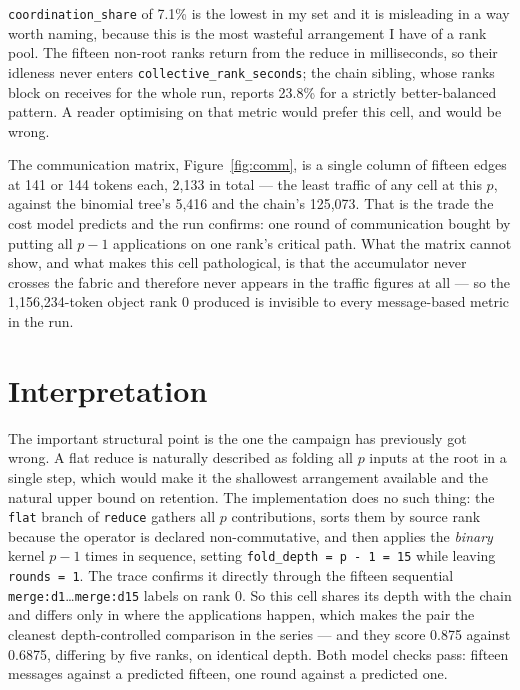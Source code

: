 \documentclass[11pt]{article}
\begin{document}
\texttt{coordination\_share} of 7.1\% is the lowest in my set and it is misleading in a way
worth naming, because this is the most wasteful arrangement I have of a rank pool. The
fifteen non-root ranks return from the reduce in milliseconds, so their idleness never
enters \texttt{collective\_rank\_seconds}; the chain sibling, whose ranks block on receives
for the whole run, reports 23.8\% for a strictly better-balanced pattern. A reader
optimising on that metric would prefer this cell, and would be wrong.

The communication matrix, Figure~\ref{fig:comm}, is a single column of fifteen edges at 141
or 144 tokens each, 2{,}133 in total --- the least traffic of any cell at this $p$, against
the binomial tree's 5{,}416 and the chain's 125{,}073. That is the trade the cost model
predicts and the run confirms: one round of communication bought by putting all $p-1$
applications on one rank's critical path. What the matrix cannot show, and what makes this
cell pathological, is that the accumulator never crosses the fabric and therefore never
appears in the traffic figures at all --- so the 1{,}156{,}234-token object rank 0 produced
is invisible to every message-based metric in the run.

\section{Interpretation}

The important structural point is the one the campaign has previously got wrong. A flat
reduce is naturally described as folding all $p$ inputs at the root in a single step, which
would make it the shallowest arrangement available and the natural upper bound on retention.
The implementation does no such thing: the \texttt{flat} branch of \texttt{reduce} gathers
all $p$ contributions, sorts them by source rank because the operator is declared
non-commutative, and then applies the \emph{binary} kernel $p-1$ times in sequence, setting
\texttt{fold\_depth = p - 1 = 15} while leaving \texttt{rounds = 1}. The trace confirms it
directly through the fifteen sequential \texttt{merge:d1}\dots\texttt{merge:d15} labels on
rank 0. So this cell shares its depth with the chain and differs only in where the
applications happen, which makes the pair the cleanest depth-controlled comparison in the
series --- and they score 0.875 against 0.6875, differing by five ranks, on identical depth.
Both model checks pass: fifteen messages against a predicted fifteen, one round against a
predicted one.
\end{document}
